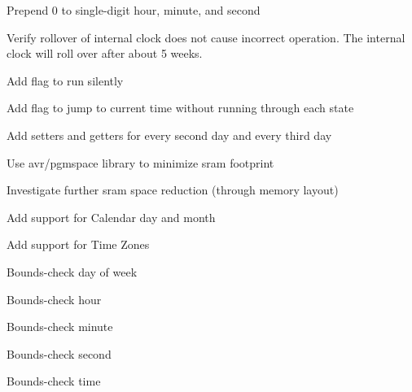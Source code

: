 
\begin{DoxyRefList}
\item[\label{todo__todo000006}%
\hypertarget{todo__todo000006}{}%
Member \hyperlink{class_clock_a6a2f193f6381ad83c324decbf1e4a8da}{Clock\-:\-:print\-Time} ()]Prepend 0 to single-\/digit hour, minute, and second  
\item[\label{todo__todo000007}%
\hypertarget{todo__todo000007}{}%
Member \hyperlink{class_clock_ad9b7f50ade881de6a61403a7bc17bbf3}{Clock\-:\-:run} ()]Verify rollover of internal clock does not cause incorrect operation. The internal clock will roll over after about 5 weeks. 

Add flag to run silently 

Add flag to jump to current time without running through each state 

Add setters and getters for every second day and every third day 

Use avr/pgmspace library to minimize sram footprint 

Investigate further sram space reduction (through memory layout) 

Add support for Calendar day and month 

Add support for Time Zones  
\item[\label{todo__todo000002}%
\hypertarget{todo__todo000002}{}%
Member \hyperlink{class_clock_a37b31e0a04e24483780398f4d53e3b70}{Clock\-:\-:set\-Day\-Of\-Week} (int day\-Of\-Week)]Bounds-\/check day of week  
\item[\label{todo__todo000003}%
\hypertarget{todo__todo000003}{}%
Member \hyperlink{class_clock_ac0eb2849ca938074df4d3f81d18861a1}{Clock\-:\-:set\-Hour} (int hour)]Bounds-\/check hour  
\item[\label{todo__todo000004}%
\hypertarget{todo__todo000004}{}%
Member \hyperlink{class_clock_a4107811dfffbafaea5b54fcdf236c5f1}{Clock\-:\-:set\-Minute} (int minute)]Bounds-\/check minute  
\item[\label{todo__todo000005}%
\hypertarget{todo__todo000005}{}%
Member \hyperlink{class_clock_a2f5112d5b6060a6a88d006a3a57cf29b}{Clock\-:\-:set\-Second} (int second)]Bounds-\/check second  
\item[\label{todo__todo000001}%
\hypertarget{todo__todo000001}{}%
Member \hyperlink{class_clock_a92d1b6aaae12a00f3627924eb473c0da}{Clock\-:\-:set\-Time} (unsigned long time)]Bounds-\/check time 
\end{DoxyRefList}